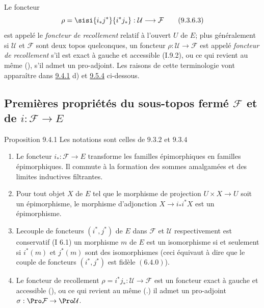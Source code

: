 \documentclass[10pt]{../fichiers-configuration-latex/smfart}
\begin{document}
Le foncteur
\begin{equation*}
\rho=\sisi{i_{\ast}j^{\ast}}{i^{\ast}j_{\ast}}:\mathcal{U}\longrightarrow
\mathcal{F}\tag{9.3.6.3}
\end{equation*}
est appelé le \emph{foncteur de recollement} relatif à l'ouvert $U$
de $E$; plus généralement si $\mathcal{U}$ et $\mathcal{F}$ sont
deux topos quelconques, un foncteur $\rho:\mathcal{U}\rightarrow
\mathcal{F}$ est appelé \emph{foncteur de recollement} s'il est
exact à gauche et accessible (I.9.2), ou ce qui revient au même
(), s'il admet un pro-adjoint. Les raisons de
cette terminologie vont apparaître dans \hyperref[IV.prop9.4.1]{9.4.1} d) et
\hyperref[IV.theo9.5.4]{9.5.4} ci-dessous.

\subsection{Premières propriétés du sous-topos fermé
$\mathcal{F}$ et de $i:\mathcal{F}\rightarrow
E$}

\begin{enonce*}{Proposition 9.4.1}
Les notations sont celles de $\hyperref[IV.subsubsec9.3.2]{9.3.2}$ et
$\hyperref[IV.prop9.3.4]{9.3.4}$
\begin{enumerate}
\renewcommand{\theenumi}{\alph{enumi}}
\renewcommand{\labelenumi}{\theenumi)}
\item Le foncteur $i_{\ast}:\mathcal{F}\rightarrow E$ transforme les
familles épimorphiques en familles épimorphiques. Il commute à la
formation des sommes amalgamées et des limites inductives
filtrantes.

\item Pour tout objet $X$ de $E$ tel que le morphisme de projection
$U\times X\rightarrow U$ soit un épimorphisme, le morphisme
d'adjonction $X\rightarrow i_{\ast} i^{\ast}X$ est un épimorphisme.

\item Le\pageoriginale couple de foncteurs $(i^{\ast}, j^{\ast})$ de
$E$ dans $\mathcal{F}$ et $\mathcal{U}$ respectivement est
conservatif {\rm (I 6.1)} \ie un morphisme $m$ de $E$ est un
isomorphisme si et seulement si $i^{\ast}(m)$ et $j^{\ast}(m)$ sont
des isomorphismes (ceci équivaut à dire que le couple de foncteurs
$(i^{\ast}, j^{\ast})$ est fidèle $(\hyperref[IV.subsubsec6.4.0]{6.4.0})$).

\item Le foncteur de recollement
$\rho=i^{\ast}j_{\ast}:\mathcal{U}\rightarrow \mathcal{F}$ est un
foncteur exact à gauche et accessible {\rm ()}, ou ce
qui revient au même {\rm(.)} il admet un pro-adjoint
$\sigma:\Pro\mathcal{F}\rightarrow \Pro \mathcal{U}$.
\end{enumerate}
\end{enonce*}
\end{document}

